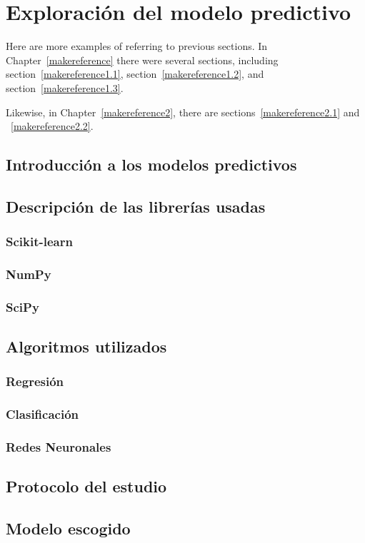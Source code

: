 \cleardoublepage

\chapter{Exploración del modelo predictivo}
\label{makereference3}

Here are more examples of referring to previous sections.  In
Chapter~\ref{makereference} there were several sections, including
section~\ref{makereference1.1}, section~\ref{makereference1.2},
and section~\ref{makereference1.3}.

Likewise, in Chapter~\ref{makereference2}, there are
sections~\ref{makereference2.1} and ~\ref{makereference2.2}.

\section{Introducción a los modelos predictivos}
\label{makereference3.1}

\section{Descripción de las librerías usadas}
\label{makereference3.2}
	\subsection{Scikit-learn}
	\subsection{NumPy}
	\subsection{SciPy}

\section{Algoritmos utilizados}
\label{makereference3.3}
	\subsection{Regresión}
	\subsection{Clasificación}
	\subsection{Redes Neuronales}
	
\section{Protocolo del estudio}
\label{makereference3.4}

\section{Modelo escogido}
\label{makereference3.5}